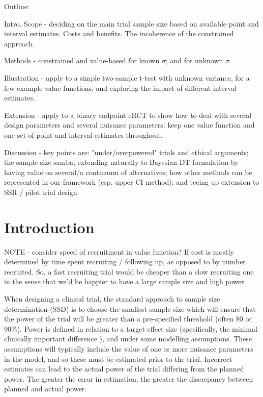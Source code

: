 \documentclass[sagev, Crown]{sagej}
\begin{document}

\maketitle

Outline:

Intro. Scope - deciding on the main trial sample size based on available point and interval estimates. Costs and benefits. The incoherence of the constrained approach.

Methods - constrained and value-based for known $\sigma$; and for unknown $\sigma$

Illustration - apply to a simple two-sample t-test with unknown variance, for a few example value functions, and exploring the impact of different interval estimates.

Extension - apply to a binary endpoint cRCT to show how to deal with several design parameters and several nuisance parameters; keep one value function and one set of point and interval estimates throughout.

Discussion - key points are: "under/overpowered" trials and ethical arguments; the sample size samba; extending naturally to Bayesian DT formulation by having value on several/a continuum of alternatives; how other methods can be represented in our framework (esp. upper CI method); and teeing up extension to SSR / pilot trial design.


\section{Introduction}\label{sec:intro}

NOTE - consider speed of recruitment in value function? If cost is mostly determined by time spent recruiting / following up, as opposed to by number recruited. So, a fast recruiting trial would be cheaper than a slow recruiting one in the sense that we'd be happier to have a large sample size and high power.

When designing a clinical trial, the standard approach to sample size determination (SSD) is to choose the smallest sample size which will ensure that the power of the trial will be greater than a pre-specified threshold (often 80 or 90\%). Power is defined in relation to a target effect size (specifically, the minimal clinically important difference \cite{Cook2018}), and under some modelling assumptions. These assumptions will typically include the value of one or more nuisance parameters in the model, and so these must be estimated prior to the trial. Incorrect estimates can lead to the actual power of the trial differing from the planned power. The greater the error in estimation, the greater the discrepancy between planned and actual power.
\end{document}
